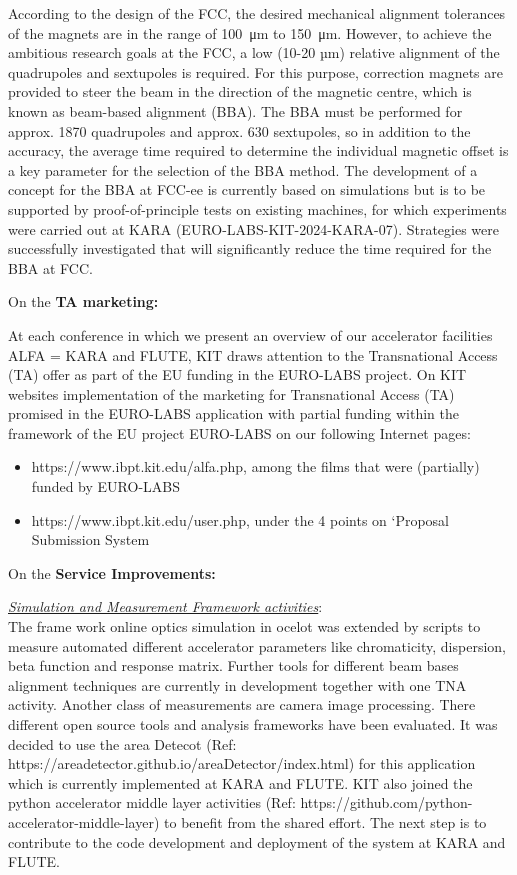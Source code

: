 According to the design of the FCC, the desired mechanical alignment tolerances of the magnets are in the range of \SI{100}{\micro\meter} to \SI{150}{\micro\meter}. However, to achieve the ambitious research goals at the FCC, a low (10-20 µm) relative alignment of the quadrupoles and sextupoles is required. For this purpose, correction magnets are provided to steer the beam in the direction of the magnetic centre, which is known as beam-based alignment (BBA). The BBA must be performed for approx. 1870 quadrupoles and approx. 630 sextupoles, so in addition to the accuracy, the average time required to determine the individual magnetic offset is a key parameter for the selection of the BBA method. The development of a concept for the BBA at FCC-ee is currently based on simulations but is to be supported by proof-of-principle tests on existing machines, for which experiments were carried out at KARA (EURO-LABS-KIT-2024-KARA-07).  Strategies were successfully investigated that will significantly reduce the time required for the BBA at FCC.

On the \textbf{TA marketing:}

At each conference in which we present an overview of our accelerator facilities ALFA = KARA and FLUTE, KIT draws attention to the Transnational Access (TA) offer as part of the EU funding in the EURO-LABS project. On KIT websites implementation of the marketing for Transnational Access (TA) promised in the EURO-LABS application with partial funding within the framework of the EU project EURO-LABS on our following Internet pages:
\begin{itemize}
\item https://www.ibpt.kit.edu/alfa.php, among the films that were (partially) funded by EURO-LABS

\item https://www.ibpt.kit.edu/user.php, under the 4 points on ‘Proposal Submission System
\end{itemize}

On the \textbf{Service Improvements:}

\underline{\em{Simulation and Measurement Framework activities}}: \\ 
The frame work online optics simulation in ocelot was extended by scripts to measure automated different accelerator parameters like chromaticity, dispersion, beta function and response matrix. Further tools for different beam bases alignment  techniques are currently in development together with one TNA activity. Another class of measurements are camera image processing. There different open source tools and analysis frameworks have been evaluated. It was decided to use the area Detecot (Ref: https://areadetector.github.io/areaDetector/index.html) for this application which is currently implemented at KARA and FLUTE. KIT also joined the python accelerator middle layer activities (Ref: https://github.com/python-accelerator-middle-layer) to benefit from the shared effort. The next step is to contribute to the code development and deployment of the system at KARA and FLUTE.

